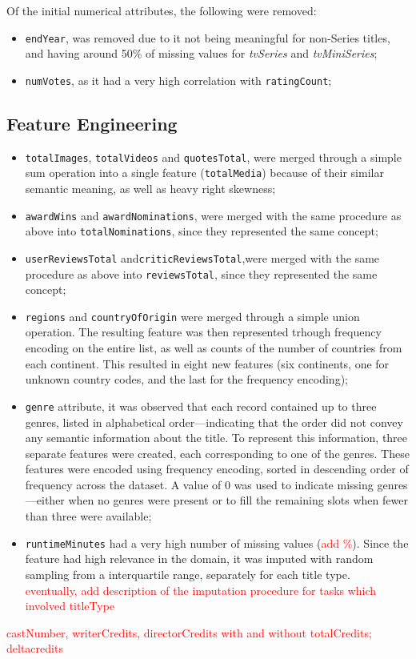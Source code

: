 Of the initial numerical attributes, the following were removed:
\begin{itemize}
    \item \texttt{endYear}, was removed due to it not being meaningful for
non-Series titles, and having around 50\% of missing values for \textit{tvSeries} and
\textit{tvMiniSeries};
    \item \texttt{numVotes}, as it had a very high correlation with \texttt{ratingCount};
\end{itemize}

\subsection{Feature Engineering}
\begin{itemize}
    \item \texttt{totalImages}, \texttt{totalVideos} and \texttt{quotesTotal}, were merged
through a simple sum operation
into a single feature (\texttt{totalMedia}) because of their similar semantic
meaning, as well as heavy right skewness;
    \item \texttt{awardWins} and \texttt{awardNominations}, were merged with the same procedure
as above into \texttt{totalNominations}, since they represented the same concept;
    \item \texttt{userReviewsTotal} and\texttt{criticReviewsTotal},were merged with the same procedure
as above into \texttt{reviewsTotal}, since they represented the same concept;
    \item \texttt{regions} and \texttt{countryOfOrigin}
were merged through a simple union operation. The resulting feature was then
represented trhough frequency encoding on the entire list, as well as
counts of the number of countries from each continent.
This resulted in eight new features (six continents, one for unknown country codes,
and the last for the frequency encoding);
    \item \texttt{genre} attribute, it was observed that each record
contained up to three genres, listed in alphabetical order—indicating that the order
did not convey any semantic information about the title.
To represent this information, three separate features were created, each
corresponding to one of the genres. These features were encoded using frequency
encoding, sorted in descending order of frequency across the dataset.  
A value of 0 was used to indicate missing genres—either when no genres were present or
to fill the remaining slots when fewer than three were available;
    \item \texttt{runtimeMinutes} had a very high number of missing values (\textcolor{red}{add
\%}). Since the feature had high relevance in the domain, it was
imputed with random sampling from a interquartile range, separately for each title
type.\\
\textcolor{red}{eventually, add description of the imputation procedure for
tasks which involved titleType}


\end{itemize}

\textcolor{red}{castNumber, writerCredits, directorCredits with and without
totalCredits; deltacredits}\\

